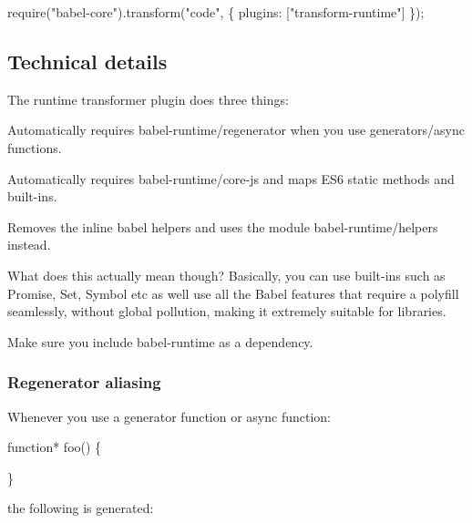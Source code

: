 \begin{DoxyCode}
require("babel-core").transform("code", \{
  plugins: ["transform-runtime"]
\});
\end{DoxyCode}


\subsection*{Technical details}

The {\ttfamily runtime} transformer plugin does three things\+:


\begin{DoxyItemize}
\item Automatically requires {\ttfamily babel-\/runtime/regenerator} when you use generators/async functions.
\item Automatically requires {\ttfamily babel-\/runtime/core-\/js} and maps E\+S6 static methods and built-\/ins.
\item Removes the inline babel helpers and uses the module {\ttfamily babel-\/runtime/helpers} instead.
\end{DoxyItemize}

What does this actually mean though? Basically, you can use built-\/ins such as {\ttfamily Promise}, {\ttfamily Set}, {\ttfamily Symbol} etc as well use all the Babel features that require a polyfill seamlessly, without global pollution, making it extremely suitable for libraries.

Make sure you include {\ttfamily babel-\/runtime} as a dependency.

\subsubsection*{Regenerator aliasing}

Whenever you use a generator function or async function\+:


\begin{DoxyCode}
function* foo() \{

\}
\end{DoxyCode}


the following is generated\+:




